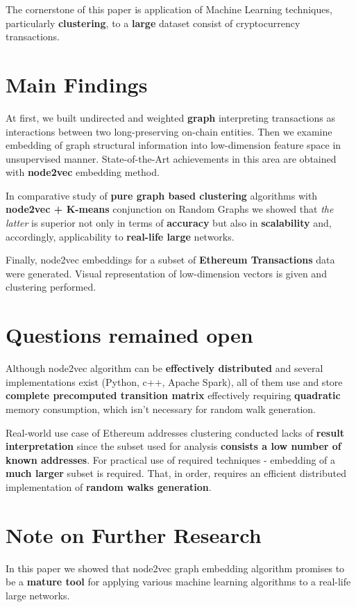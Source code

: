 \Conclusion
The cornerstone of this paper is application of Machine Learning techniques, particularly \textbf{clustering}, to a \textbf{large} dataset consist of cryptocurrency transactions.

\section{Main Findings}
At first, we built undirected and weighted \textbf{graph} interpreting transactions as interactions between two long-preserving on-chain entities. Then we examine embedding of graph structural information into low-dimension feature space in unsupervised manner. 
State-of-the-Art achievements in this area are obtained with \textbf{node2vec} embedding method. 

In comparative study of \textbf{pure graph based clustering} algorithms with \textbf{node2vec + K-means} conjunction on Random Graphs we showed that \textit{the latter} is superior not only in terms of \textbf{accuracy} but also in \textbf{scalability} and, accordingly, applicability to \textbf{real-life large} networks.

Finally, node2vec embeddings for a subset of \textbf{Ethereum Transactions} data were generated. Visual representation of low-dimension vectors is given and clustering performed.

\section{Questions remained open}
Although node2vec algorithm can be \textbf{effectively distributed} and several implementations exist (Python, c++, Apache Spark), all of them use and store \textbf{complete precomputed transition matrix} effectively requiring \textbf{quadratic}\cite{DBLP:journals/corr/abs-1805-00280} memory consumption, which isn't  necessary for random walk generation. 

Real-world use case of Ethereum addresses clustering conducted lacks of \textbf{result interpretation} since the subset used for analysis \textbf{consists a low number of known addresses}. For practical use of required techniques - embedding of a \textbf{much larger} subset is required. That, in order, requires an efficient distributed implementation of \textbf{random walks generation}. 

\section{Note on Further Research}
In this paper we showed that node2vec graph embedding algorithm promises to be a \textbf{mature tool} for applying various machine learning algorithms to a real-life large networks.

